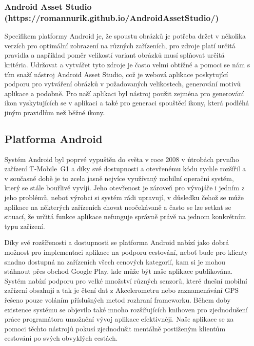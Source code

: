 \documentclass[czech,master,public,dept460,male,java,cpdeclaration]{diploma}
\begin{document}
 \subsubsection{Android Asset Studio (https://romannurik.github.io/AndroidAssetStudio/)}
 Specifikem platformy Android je, že spoustu obrázků je potřeba držet v několika verzích pro optimální
 zobrazení na různých zařízeních, pro zdroje platí určitá pravidla a například poměr velikostí variant
 obrázků musí splňovat určitá kritéria. Udržovat a vytvářet tyto zdroje je často velmi obtížné
 a pomoci se nám s tím snaží nástroj Android Asset Studio, což je webová aplikace poskytující
 podporu pro vytváření obrázků v požadovaných velikostech, generování motivů aplikace a podobně.
 Pro naší aplikaci byl nástroj použit zejména pro generování ikon vyskytujících se v aplikaci
 a také pro generaci spouštěcí ikony, která podléhá jiným pravidlům než běžné ikony.


\subsection{Platforma Android}
Systém Android byl poprvé vypuštěn do světa v roce 2008 v útrobách prvního zařízení T-Mobile~G1\cite{androidcentral}
a díky své dostupnosti a otevřenému kódu rychle rozšířil a v současné době je to zcela jasně nejvíce využívaný mobilní
operační systém, který se stále bouřlivě vyvíjí. Jeho otevřenost je zároveň pro vývojáře i jedním z jeho problémů,
neboť výrobci si systém rádi upravují, v důsledku čehož se může aplikace na některých zařízeních chovat
neočekávaně a často se lze setkat se situací, že určitá funkce aplikace nefunguje správně právě na
jednom konkrétním typu zařízení.

Díky své rozšířenosti a dostupnosti se platforma Android nabízí jako dobrá možnost pro implementaci
aplikace na podporu cestování, neboť bude pro klienty snadno dostupná na zařízeních všech cenových
kategorií, kam si je mohou stáhnout přes obchod Google Play, kde může být naše aplikace publikována.
Systém nabízí podporu pro velké množství různých senzorů, které dnešní mobilní zařízení obsahují
a tak je čtení dat z Akcelerometru nebo zaznamenávání GPS řešeno pouze voláním příslušných metod
rozhraní frameworku. Během doby existence systému se objevilo také mnoho rozšiřujících knihoven
pro zjednodušení práce programátora umožnění vývoj aplikace efektivněji. Naše aplikace se
za pomoci těchto nástrojů pokusí zjednodušit mentálně postiženým klientům cestování po svých
obvyklých cestách.
\end{document}
